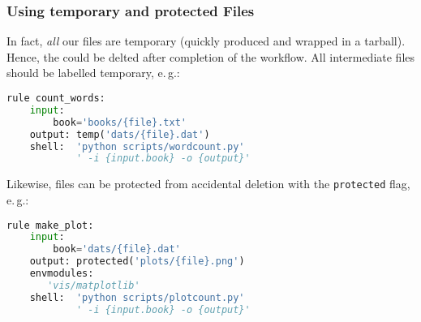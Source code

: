 \begin{frame}[fragile]
  \frametitle{Using temporary and protected Files}
  In fact, \emph{all} our files are temporary (quickly produced and wrapped in a tarball). Hence, the could be delted after completion of the workflow. All intermediate files should be labelled temporary, e.\,g.:
  \begin{lstlisting}[language=Python,style=Python,basicstyle=\tiny]
rule count_words:
    input:
        book='books/{file}.txt'
    output: temp('dats/{file}.dat')
    shell:  'python scripts/wordcount.py'
            ' -i {input.book} -o {output}'
  \end{lstlisting}
  \pause
  Likewise, files can be protected from accidental deletion with the \texttt{protected} flag, e.\,g.:
  \begin{lstlisting}[language=Python,style=Python,basicstyle=\tiny]
rule make_plot:
    input:
        book='dats/{file}.dat'
    output: protected('plots/{file}.png')
    envmodules:
       'vis/matplotlib'
    shell:  'python scripts/plotcount.py'
            ' -i {input.book} -o {output}'
  \end{lstlisting}
\end{frame}




